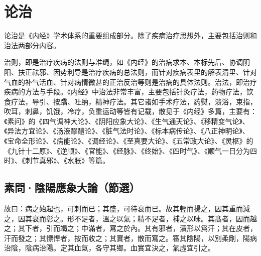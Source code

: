 \documentclass[draft,12pt]{ctexbook}
\begin{document}
\pagestyle{main2}
\fi
\chapter{论治}%
论治是《内经》学术体系的重要组成部分。除了疾病治疗思想外，主要包括治则和治法两部分内容。

治则，即是治疗疾病的法则与准绳，如《内经》的治病求本、本标先后、协调阴阳、扶正祛邪、因势利导是治疗疾病的总法则，而针对疾病表里的解表清里、针对气血的补气活血、针对病情微甚的正治反治等则是治病的具体法则。治法，即治疗疾病的方法与手段。《内经》中治法非常丰富，主要包括针灸疗法，药物疗法，饮食疗法，导引、按蹻、吐纳，精神疗法。其它诸如手术疗法，药熨，溃浴，束指，吹耳，刺鼻，饥饿，冷疗，负重运动等皆有记载，散见于《内经》多篇，主要有：《素问》的《四气调神大论》、《阴阳应象大论》、《生气通天论》、《移精变气论》、《异法方宜论》、《汤液醪醴论》、《脏气法时论》、《标本病传论》、《八正神明论》、《宝命全形论》、《病能论》、《调经论》、《至真要大论》、《五常政大论》、《灵枢》的《九针十二原》、《逆顺》、《官能》、《经脉》、《终始》、《四时气》、《顺气一日分为四时》、《刺节真邪》、《水胀》等篇。

\section{素問·陰陽應象大論（節選）}%


\begin{yuanwen}
故曰：病之始起也，可刺而已；其盛，可待衰而已。故其輕而揚之，因其重而減之，因其衰而彰之。形不足者，溫之以氣；精不足者，補之以味。其髙者，因而越之；其下者，引而竭之；中滿者，寫之於內。其有邪者，漬形以爲汗；其在皮者，汗而發之；其慓悍者，按而收之；其實者，散而寫之。審其陰陽，以別柔剛，陽病治陰，陰病治陽。定其血氣，各守其鄉。血實宜決之，氣虛宜引之。
\end{yuanwen}

\end{document}
